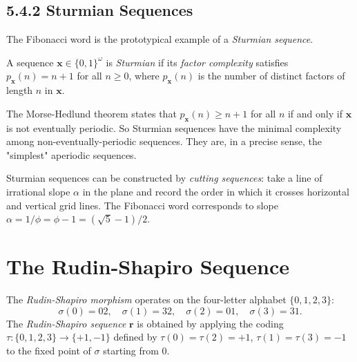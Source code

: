 \subsection{5.4.2 Sturmian Sequences}

The Fibonacci word is the prototypical example of a \textit{Sturmian sequence}.

\begin{definition}
A sequence $\mathbf{x} \in \{ 0,1\} ^\omega$ is \textit{Sturmian} if its \textit{factor complexity} satisfies $p_{\mathbf{x}}(n) = n + 1$ for all $n \geq 0$, where $p_{\mathbf{x}}(n)$ is the number of distinct factors of length $n$ in $\mathbf{x}$.

The Morse-Hedlund theorem states that $p_{\mathbf{x}}(n) \geq n+1$ for all $n$ if and only if $\mathbf{x}$ is not eventually periodic. So Sturmian sequences have the minimal complexity among non-eventually-periodic sequences. They are, in a precise sense, the "simplest" aperiodic sequences.

Sturmian sequences can be constructed by \textit{cutting sequences}: take a line of irrational slope $\alpha$ in the plane and record the order in which it crosses horizontal and vertical grid lines. The Fibonacci word corresponds to slope $\alpha = 1/\phi = \phi - 1 = (\sqrt{5}-1)/2$.
\end{definition}



\section{The Rudin-Shapiro Sequence}

\begin{definition}
The \textit{Rudin-Shapiro morphism} operates on the four-letter alphabet $\{ 0,1,2,3\} $:
\[\sigma(0) = 02, \quad \sigma(1) = 32, \quad \sigma(2) = 01, \quad \sigma(3) = 31.\]
The \textit{Rudin-Shapiro sequence} $\mathbf{r}$ is obtained by applying the coding $\tau: \{ 0,1,2,3\}  \to \{ +1,-1\} $ defined by $\tau(0) = \tau(2) = +1$, $\tau(1) = \tau(3) = -1$ to the fixed point of $\sigma$ starting from $0$.
\end{definition}

